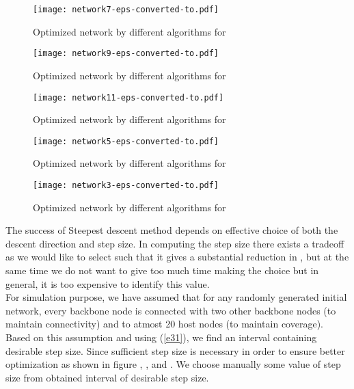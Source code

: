 \documentclass[11pt]{article}
\numberwithin{equation}{section}
\begin{document}
\begin{figure}[htb!]
\begin{center}
\texttt{[image: network7-eps-converted-to.pdf]}
\end{center}
\caption{Optimized network by different algorithms for }\label{f2}
\end{figure}
\begin{figure*}[htb!]
\begin{center}
\texttt{[image: network9-eps-converted-to.pdf]}
\end{center}
\caption{Optimized network by different algorithms for }\label{f3}
\end{figure*}
\begin{figure*}[htb!]
\begin{center}
\texttt{[image: network11-eps-converted-to.pdf]}
\end{center}
\caption{Optimized network by different algorithms for }\label{f4}
\end{figure*}
\begin{figure*}[htb!]
\begin{center}
\texttt{[image: network5-eps-converted-to.pdf]}
\end{center}
\caption{Optimized network by different algorithms for }\label{f5}
\end{figure*}
\begin{figure*}[htb!]
\begin{center}
\texttt{[image: network3-eps-converted-to.pdf]}
\end{center}
\caption{Optimized network by different algorithms for }\label{f6}
\end{figure*}
\newpage

 The success of Steepest descent method depends on effective choice of both the descent direction and step size. In computing the step size  there exists a tradeoff as we would like to select  such that it gives a substantial reduction in , but at the same time we do not want to give too much time making the choice but in general, it is too expensive to identify this value.\\

For simulation purpose, we have assumed that for any randomly generated initial network, every backbone node is connected with two other backbone nodes (to maintain connectivity) and to atmost 20 host nodes (to maintain coverage). Based on this assumption and using (\ref{e31}), we find an interval containing desirable step size. Since sufficient step size  is necessary in order to ensure better optimization as shown in figure , , and . We choose manually some value of step size from obtained interval of desirable step size.\\
\end{document}
